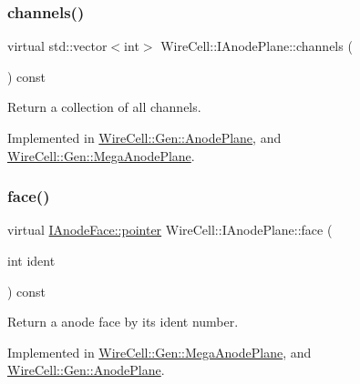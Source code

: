 \subsubsection{\texorpdfstring{channels()}{channels()}}
{\footnotesize\ttfamily virtual std\+::vector$<$int$>$ Wire\+Cell\+::\+I\+Anode\+Plane\+::channels (\begin{DoxyParamCaption}{ }\end{DoxyParamCaption}) const\hspace{0.3cm}{\ttfamily [pure virtual]}}



Return a collection of all channels. 



Implemented in \hyperlink{class_wire_cell_1_1_gen_1_1_anode_plane_ad934104bec0191d14920a1ef01cc8f00}{Wire\+Cell\+::\+Gen\+::\+Anode\+Plane}, and \hyperlink{class_wire_cell_1_1_gen_1_1_mega_anode_plane_a1106718600e8a867efd62a7c9dedafd2}{Wire\+Cell\+::\+Gen\+::\+Mega\+Anode\+Plane}.

\mbox{\label{class_wire_cell_1_1_i_anode_plane_ad420395805cd4a1c07253b535768fd5a}} 
\subsubsection{\texorpdfstring{face()}{face()}}
{\footnotesize\ttfamily virtual \hyperlink{class_wire_cell_1_1_interface_a09c548fb8266cfa39afb2e74a4615c37}{I\+Anode\+Face\+::pointer} Wire\+Cell\+::\+I\+Anode\+Plane\+::face (\begin{DoxyParamCaption}\item[{int}]{ident }\end{DoxyParamCaption}) const\hspace{0.3cm}{\ttfamily [pure virtual]}}



Return a anode face by its ident number. 



Implemented in \hyperlink{class_wire_cell_1_1_gen_1_1_mega_anode_plane_ad9c13939093664e740ade87c8d89ba94}{Wire\+Cell\+::\+Gen\+::\+Mega\+Anode\+Plane}, and \hyperlink{class_wire_cell_1_1_gen_1_1_anode_plane_a429403f80c922cd168213c049ecadeea}{Wire\+Cell\+::\+Gen\+::\+Anode\+Plane}.

\mbox{\label{class_wire_cell_1_1_i_anode_plane_a22ebdffd5613bf8007e0ae314984c36a}} 
